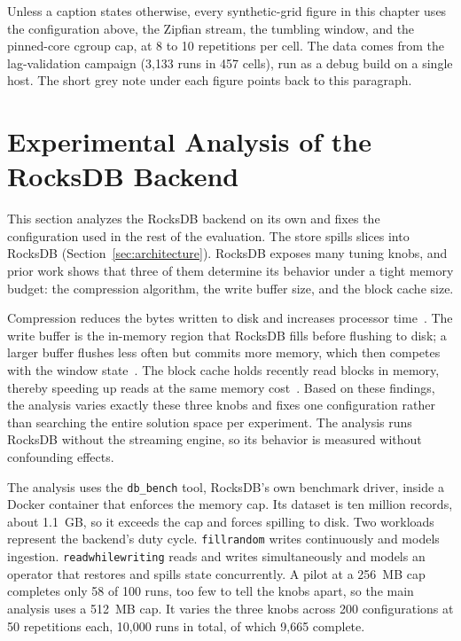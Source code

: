 Unless a caption states otherwise, every synthetic-grid figure in this chapter uses the configuration above, the Zipfian stream, the tumbling window, and the pinned-core cgroup cap, at 8 to 10 repetitions per cell.\label{sec:methods-grid}
The data comes from the lag-validation campaign (3{,}133 runs in 457 cells), run as a debug build on a single host.
The short grey note under each figure points back to this paragraph.

\section{Experimental Analysis of the RocksDB Backend\label{sec:rocksdb-eval}}

This section analyzes the RocksDB backend on its own and fixes the configuration used in the rest of the evaluation.\label{sec:rocksdb-config}
The store spills slices into RocksDB (Section~\ref{sec:architecture}).
RocksDB exposes many tuning knobs, and prior work shows that three of them determine its behavior under a tight memory budget: the compression algorithm, the write buffer size, and the block cache size.

Compression reduces the bytes written to disk and increases processor time~\cite{rocksdb-compression}.
The write buffer is the in-memory region that RocksDB fills before flushing to disk; a larger buffer flushes less often but commits more memory, which then competes with the window state~\cite{rocksdb-memory}.
The block cache holds recently read blocks in memory, thereby speeding up reads at the same memory cost~\cite{rocksdb-memory}.
Based on these findings, the analysis varies exactly these three knobs and fixes one configuration rather than searching the entire solution space per experiment.
The analysis runs RocksDB without the streaming engine, so its behavior is measured without confounding effects.

The analysis uses the \texttt{db\_bench} tool, RocksDB's own benchmark driver, inside a Docker container that enforces the memory cap.
Its dataset is ten million records, about 1.1\, GB, so it exceeds the cap and forces spilling to disk.
Two workloads represent the backend's duty cycle.
\texttt{fillrandom} writes continuously and models ingestion.
\texttt{readwhilewriting} reads and writes simultaneously and models an operator that restores and spills state concurrently.
A pilot at a 256\, MB cap completes only 58 of 100 runs, too few to tell the knobs apart, so the main analysis uses a 512\, MB cap.
It varies the three knobs across 200 configurations at 50 repetitions each, 10{,}000 runs in total, of which 9{,}665 complete.

